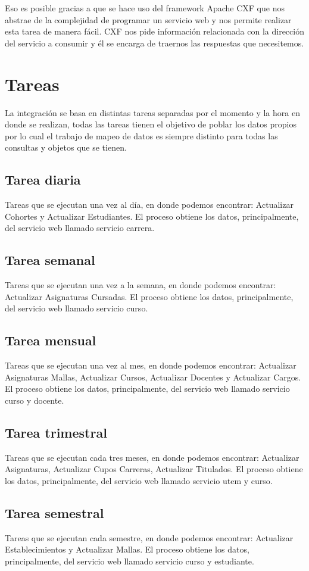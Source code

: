 \documentclass[a4paper,12pt,openany,oneside]{book}
\begin{document}
Eso es posible gracias a que se hace uso del framework Apache CXF que nos abstrae de la complejidad de programar un servicio web y nos permite realizar esta tarea de manera fácil. CXF nos pide información relacionada con la dirección del servicio a consumir y él se encarga de traernos las respuestas que necesitemos.
\section{Tareas}
La integración se basa en distintas tareas separadas por el momento y la hora en donde se realizan, todas las tareas tienen el objetivo de poblar los datos propios por lo cual el trabajo de mapeo de datos es siempre distinto para todas las consultas y objetos que se tienen.
\subsection{Tarea diaria}
Tareas que se ejecutan una vez al día, en donde podemos encontrar: Actualizar Cohortes y Actualizar Estudiantes. El proceso obtiene los datos, principalmente, del servicio web llamado servicio carrera.
\subsection{Tarea semanal}
Tareas que se ejecutan una vez a la semana, en donde podemos encontrar: Actualizar Asignaturas Cursadas. El proceso obtiene los datos, principalmente, del servicio web llamado servicio curso.
\subsection{Tarea mensual}
Tareas que se ejecutan una vez al mes, en donde podemos encontrar: Actualizar Asignaturas Mallas, Actualizar Cursos, Actualizar Docentes y Actualizar Cargos. El proceso obtiene los datos, principalmente, del servicio web llamado servicio curso y docente.
\subsection{Tarea trimestral}
Tareas que se ejecutan cada tres meses, en donde podemos encontrar: Actualizar Asignaturas, Actualizar Cupos Carreras, Actualizar Titulados. El proceso obtiene los datos, principalmente, del servicio web llamado servicio utem y curso.
\subsection{Tarea semestral}
Tareas que se ejecutan cada semestre, en donde podemos encontrar: Actualizar Establecimientos y Actualizar Mallas. El proceso obtiene los datos, principalmente, del servicio web llamado servicio curso y estudiante.
\end{document}
